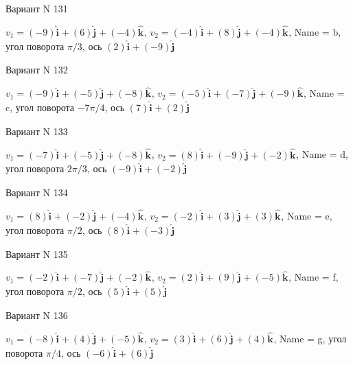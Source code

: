 \documentclass[11pt]{report}
\begin{document}
Вариант N 131

$v_1 = \left(-9\right)\mathbf{\hat{i}_{}} + \left(6\right)\mathbf{\hat{j}_{}} + \left(-4\right)\mathbf{\hat{k}_{}}$, $v_2 = \left(-4\right)\mathbf{\hat{i}_{}} + \left(8\right)\mathbf{\hat{j}_{}} + \left(-4\right)\mathbf{\hat{k}_{}}$, Name = b, угол поворота $\pi / 3$, ось $\left(2\right)\mathbf{\hat{i}_{}} + \left(-9\right)\mathbf{\hat{j}_{}}$

Вариант N 132

$v_1 = \left(-9\right)\mathbf{\hat{i}_{}} + \left(-5\right)\mathbf{\hat{j}_{}} + \left(-8\right)\mathbf{\hat{k}_{}}$, $v_2 = \left(-5\right)\mathbf{\hat{i}_{}} + \left(-7\right)\mathbf{\hat{j}_{}} + \left(-9\right)\mathbf{\hat{k}_{}}$, Name = c, угол поворота $- 7 \pi / 4$, ось $\left(7\right)\mathbf{\hat{i}_{}} + \left(2\right)\mathbf{\hat{j}_{}}$

Вариант N 133

$v_1 = \left(-7\right)\mathbf{\hat{i}_{}} + \left(-5\right)\mathbf{\hat{j}_{}} + \left(-8\right)\mathbf{\hat{k}_{}}$, $v_2 = \left(8\right)\mathbf{\hat{i}_{}} + \left(-9\right)\mathbf{\hat{j}_{}} + \left(-2\right)\mathbf{\hat{k}_{}}$, Name = d, угол поворота $2 \pi / 3$, ось $\left(-9\right)\mathbf{\hat{i}_{}} + \left(-2\right)\mathbf{\hat{j}_{}}$

Вариант N 134

$v_1 = \left(8\right)\mathbf{\hat{i}_{}} + \left(-2\right)\mathbf{\hat{j}_{}} + \left(-4\right)\mathbf{\hat{k}_{}}$, $v_2 = \left(-2\right)\mathbf{\hat{i}_{}} + \left(3\right)\mathbf{\hat{j}_{}} + \left(3\right)\mathbf{\hat{k}_{}}$, Name = e, угол поворота $\pi / 2$, ось $\left(8\right)\mathbf{\hat{i}_{}} + \left(-3\right)\mathbf{\hat{j}_{}}$

Вариант N 135

$v_1 = \left(-2\right)\mathbf{\hat{i}_{}} + \left(-7\right)\mathbf{\hat{j}_{}} + \left(-2\right)\mathbf{\hat{k}_{}}$, $v_2 = \left(2\right)\mathbf{\hat{i}_{}} + \left(9\right)\mathbf{\hat{j}_{}} + \left(-5\right)\mathbf{\hat{k}_{}}$, Name = f, угол поворота $\pi / 2$, ось $\left(5\right)\mathbf{\hat{i}_{}} + \left(5\right)\mathbf{\hat{j}_{}}$

Вариант N 136

$v_1 = \left(-8\right)\mathbf{\hat{i}_{}} + \left(4\right)\mathbf{\hat{j}_{}} + \left(-5\right)\mathbf{\hat{k}_{}}$, $v_2 = \left(3\right)\mathbf{\hat{i}_{}} + \left(6\right)\mathbf{\hat{j}_{}} + \left(4\right)\mathbf{\hat{k}_{}}$, Name = g, угол поворота $\pi / 4$, ось $\left(-6\right)\mathbf{\hat{i}_{}} + \left(6\right)\mathbf{\hat{j}_{}}$
\end{document}
